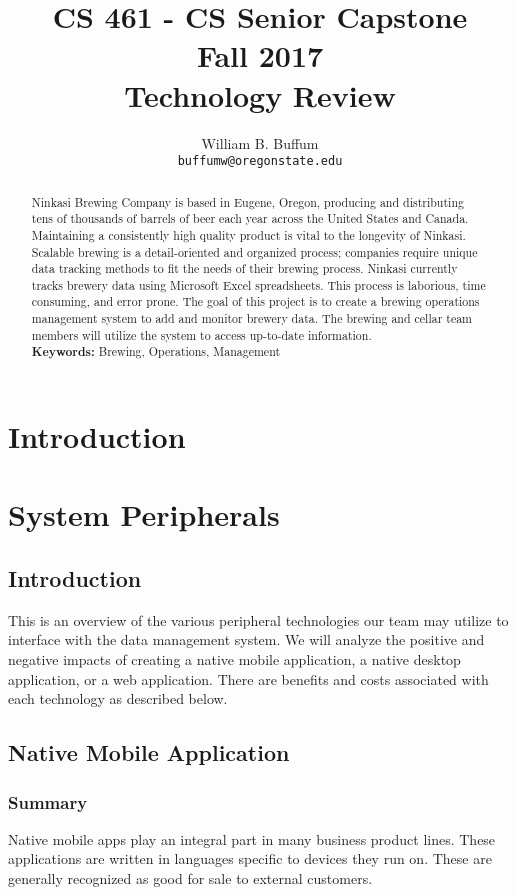 \documentclass[draftclsnofoot,onecolumn,letterpaper,10pt,compsoc]{IEEEtran}
\title{CS 461 - CS Senior Capstone
	\\Fall 2017
	\\Technology Review
}
\author{
	William B. Buffum \\
	\texttt{buffumw@oregonstate.edu}
}
\begin{document}
\begin{titlingpage}
    \maketitle
    \begin{abstract}
      Ninkasi Brewing Company is based in Eugene, Oregon, producing and distributing tens of thousands of barrels of beer each year across the United States and Canada.
      Maintaining a consistently high quality product is vital to the longevity of Ninkasi.
      Scalable brewing is a detail-oriented and organized process; companies require unique data tracking methods to fit the needs of their brewing process.
      Ninkasi currently tracks brewery data using Microsoft Excel spreadsheets.
      This process is laborious, time consuming, and error prone.
      The goal of this project is to create a brewing operations management system to add and monitor brewery data.
      The brewing and cellar team members will utilize the system to access up-to-date information.
      \\
      \textbf{Keywords:} Brewing, Operations, Management
    \end{abstract}
		\pagebreak
		\tableofcontents
\end{titlingpage}

\section{Introduction}

\section{System Peripherals}
    \subsection{Introduction}
        This is an overview of the various peripheral technologies our team may utilize to interface with the data management system. 
        We will analyze the positive and negative impacts of creating a native mobile application, a native desktop application, or a web application.
        There are benefits and costs associated with each technology as described below.

	\subsection{Native Mobile Application}
        \subsubsection{Summary}
            Native mobile apps play an integral part in many business product lines.
            These applications are written in languages specific to devices they run on.
            These are generally recognized as good for sale to external customers\cite{SearchCloudOverview}.
\end{document}
